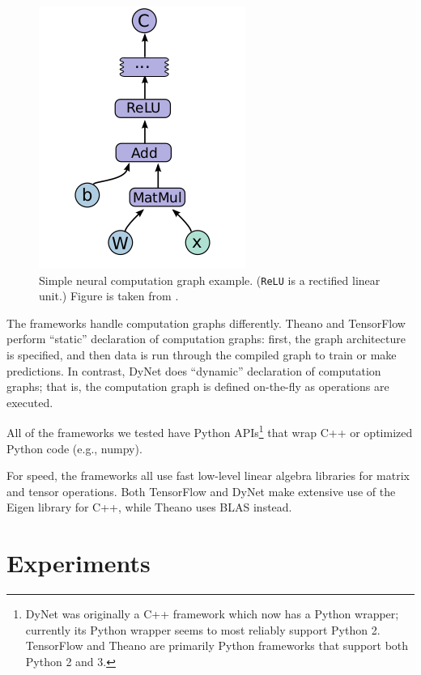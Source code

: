 \documentclass{article}
\begin{document}
\begin{figure}\begin{center}
\includegraphics[scale=.4]{graphics/tensorflowGraph.png}
\caption{\label{fig:compGraph}Simple neural computation graph example. (\texttt{ReLU} is a rectified linear unit.) Figure is taken from \protect\cite{tensorflow}.} 
\end{center}\end{figure}

The frameworks handle computation graphs differently. Theano and TensorFlow perform ``static'' declaration of computation graphs: first, the graph architecture is specified, and then data is run through the compiled graph to train or make predictions. In contrast, DyNet does ``dynamic'' declaration of computation graphs; that is, the computation graph is defined on-the-fly as operations are executed.

All of the frameworks we tested have Python APIs\footnote{DyNet was originally a C++ framework which now has a Python wrapper; currently its Python wrapper seems to most reliably support Python 2. TensorFlow and Theano are primarily Python frameworks that support both Python 2 and 3.} that wrap C++ or optimized Python code (e.g., numpy).

For speed, the frameworks all use fast low-level linear algebra libraries for matrix and tensor operations. Both TensorFlow and DyNet make extensive use of the Eigen library for C++, while Theano uses BLAS instead.


\section{Experiments}
\end{document}
